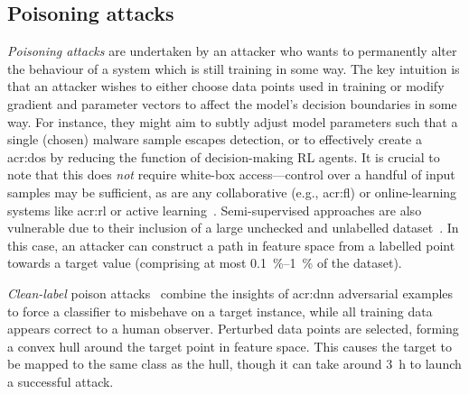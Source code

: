 
\subsection{Poisoning attacks}
\emph{Poisoning attacks} are undertaken by an attacker who wants to permanently alter the behaviour of a system which is still training in some way.
The key intuition is that an attacker wishes to either choose data points used in training or modify gradient and parameter vectors to affect the model's decision boundaries in some way.
For instance, they might aim to subtly adjust model parameters such that a single (chosen) malware sample escapes detection, or to effectively create a \gls{acr:dos} by reducing the function of decision-making RL agents.
It is crucial to note that this does \emph{not} require white-box access---control over a handful of input samples may be sufficient, as are any collaborative (e.g., \gls{acr:fl}) or online-learning systems like \gls{acr:rl} or active learning~\parencite{active-learning-report}.
Semi-supervised approaches are also vulnerable due to their inclusion of a large unchecked and unlabelled dataset~\parencite{DBLP:conf/uss/Carlini21}.
In this case, an attacker can construct a path in feature space from a labelled point towards a target value (comprising at most \qtyrange{0.1}{1}{\percent} of the dataset).

\emph{Clean-label} poison attacks~\parencite{DBLP:journals/corr/abs-2005-00191} combine the insights of \gls{acr:dnn} adversarial examples to force a classifier to misbehave on a target instance, while all training data appears correct to a human observer.
Perturbed data points are selected, forming a convex hull around the target point in feature space.
This causes the target to be mapped to the same class as the hull, though it can take around \qty{3}{\hour} to launch a successful attack.

